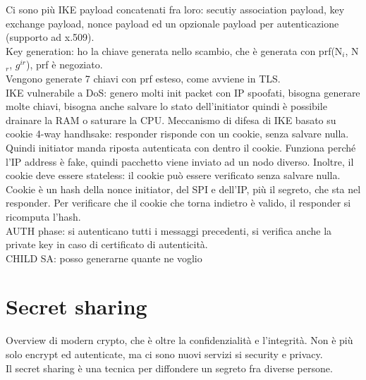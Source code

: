 \documentclass[16px]{article}
\begin{document}
Ci sono più IKE payload concatenati fra loro: secutiy association payload, key exchange payload, nonce payload ed un opzionale payload per autenticazione (supporto ad x.509).\\ Key generation: ho la chiave generata nello scambio, che è generata con prf(N$_i$, N$_r$, $g^{ir}$), prf è negoziato.\\ Vengono generate 7 chiavi con prf esteso, come avviene in TLS.\\ IKE vulnerabile a DoS: genero molti init packet con IP spoofati, bisogna generare molte chiavi, bisogna anche salvare lo stato dell'initiator quindi è possibile drainare la RAM o saturare la CPU. Meccanismo di difesa di IKE basato su cookie 4-way handhsake: responder risponde con un cookie, senza salvare nulla. Quindi initiator manda riposta autenticata con dentro il cookie. Funziona perché l'IP address è fake, quindi pacchetto viene inviato ad un nodo diverso. Inoltre, il cookie deve essere stateless: il cookie può essere verificato senza salvare nulla. Cookie è un hash  della nonce initiator, del SPI e dell'IP, più il segreto, che sta nel responder. Per verificare che il cookie che torna indietro è valido, il responder si ricomputa l'hash.\\ AUTH phase: si autenticano tutti i messaggi precedenti, si verifica anche la private key in caso di certificato di autenticità.\\ CHILD SA: posso generarne quante ne voglio
\section{Secret sharing}
Overview di modern crypto, che è oltre la confidenzialità e l'integrità. Non è più solo encrypt ed autenticate, ma ci sono nuovi servizi si security e privacy.\\ Il secret sharing è una tecnica per diffondere un segreto fra diverse persone.
\end{document}
